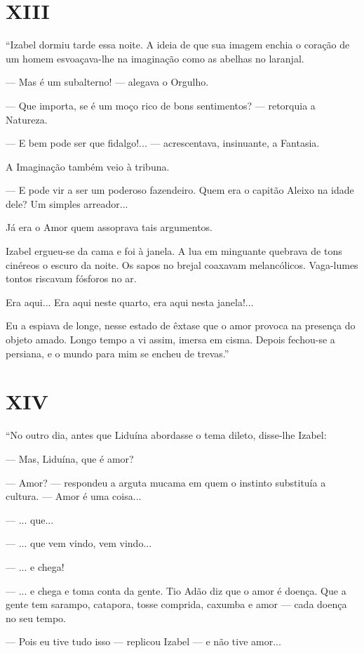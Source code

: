 \section{XIII}

``Izabel dormiu tarde essa noite. A ideia de que sua imagem enchia o
coração de um homem esvoaçava-lhe na imaginação como as abelhas no
laranjal.

--- Mas é um subalterno! --- alegava o Orgulho.

--- Que importa, se é um moço rico de bons sentimentos? --- retorquia a
Natureza.

--- E bem pode ser que fidalgo!... --- acrescentava, insinuante, a
Fantasia.

A Imaginação também veio à tribuna.

--- E pode vir a ser um poderoso fazendeiro. Quem era o capitão Aleixo
na idade dele? Um simples arreador...

Já era o Amor quem assoprava tais argumentos.

Izabel ergueu-se da cama e foi à janela. A lua em minguante quebrava de
tons cinéreos o escuro da noite. Os sapos no brejal coaxavam
melancólicos. Vaga-lumes tontos riscavam fósforos no ar.

Era aqui... Era aqui neste quarto, era aqui nesta janela!...

Eu a espiava de longe, nesse estado de êxtase que o amor provoca na
presença do objeto amado. Longo tempo a vi assim, imersa em cisma.
Depois fechou-se a persiana, e o mundo para mim se encheu de trevas.''

\section{XIV}

``No outro dia, antes que Liduína abordasse o tema dileto, disse-lhe
Izabel:

--- Mas, Liduína, que é amor?

--- Amor? --- respondeu a arguta mucama em quem o instinto substituía a
cultura. --- Amor é uma coisa...

--- ... que...

--- ... que vem vindo, vem vindo...

--- ... e chega!

--- ... e chega e toma conta da gente. Tio Adão diz que o amor é doença.
Que a gente tem sarampo, catapora, tosse comprida, caxumba e amor ---
cada doença no seu tempo.

--- Pois eu tive tudo isso --- replicou Izabel --- e não tive amor...


